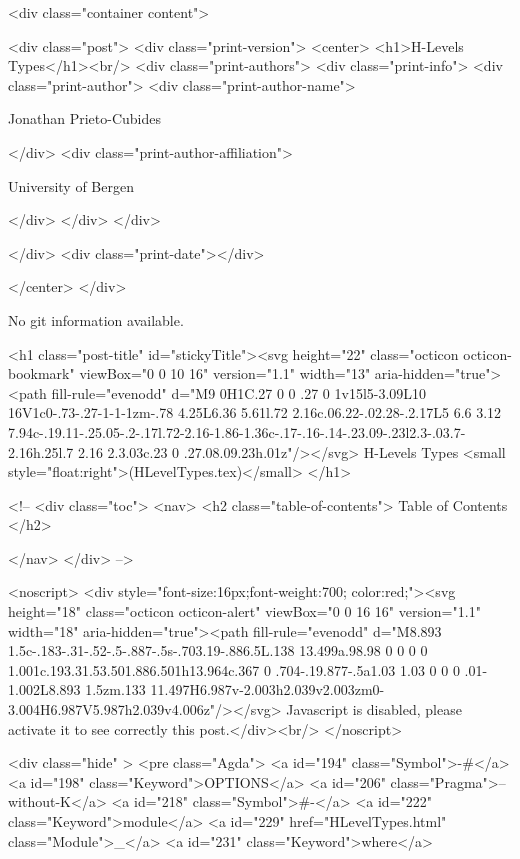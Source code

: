       <div class="container content">
        







<div class="post">
  <div class="print-version">
    <center>
      <h1>H-Levels Types</h1><br/>
        <div class="print-authors">
          <div class="print-info">
            <div class="print-author">
              <div class="print-author-name">
                
                  Jonathan Prieto-Cubides
                
              </div>
              <div class="print-author-affiliation">
                
                  University of Bergen
                
                </div>
            </div>
          </div>
          
          
        </div>
        <div class="print-date"></div>
        
        
    </center>
  </div>

  
  No git information available.
  

  <h1 class="post-title" id="stickyTitle"><svg height="22" class="octicon octicon-bookmark" viewBox="0 0 10 16" version="1.1" width="13" aria-hidden="true"><path fill-rule="evenodd" d="M9 0H1C.27 0 0 .27 0 1v15l5-3.09L10 16V1c0-.73-.27-1-1-1zm-.78 4.25L6.36 5.61l.72 2.16c.06.22-.02.28-.2.17L5 6.6 3.12 7.94c-.19.11-.25.05-.2-.17l.72-2.16-1.86-1.36c-.17-.16-.14-.23.09-.23l2.3-.03.7-2.16h.25l.7 2.16 2.3.03c.23 0 .27.08.09.23h.01z"/></svg> H-Levels Types <small style="float:right">(HLevelTypes.tex)</small>
  </h1>

  <!-- 
  <div class="toc">
    <nav>
    <h2 class="table-of-contents"> Table of Contents </h2>
      

    </nav>
  </div>
   -->

  <noscript>
  <div style="font-size:16px;font-weight:700; color:red;"><svg height="18" class="octicon octicon-alert" viewBox="0 0 16 16" version="1.1" width="18" aria-hidden="true"><path fill-rule="evenodd" d="M8.893 1.5c-.183-.31-.52-.5-.887-.5s-.703.19-.886.5L.138 13.499a.98.98 0 0 0 0 1.001c.193.31.53.501.886.501h13.964c.367 0 .704-.19.877-.5a1.03 1.03 0 0 0 .01-1.002L8.893 1.5zm.133 11.497H6.987v-2.003h2.039v2.003zm0-3.004H6.987V5.987h2.039v4.006z"/></svg> Javascript is disabled, please activate it to see correctly this post.</div><br/>
  </noscript>

  <div class="hide" >
<pre class="Agda">
<a id="194" class="Symbol">{-#</a> <a id="198" class="Keyword">OPTIONS</a> <a id="206" class="Pragma">--without-K</a> <a id="218" class="Symbol">#-}</a>
<a id="222" class="Keyword">module</a> <a id="229" href="HLevelTypes.html" class="Module">_</a> <a id="231" class="Keyword">where</a>

